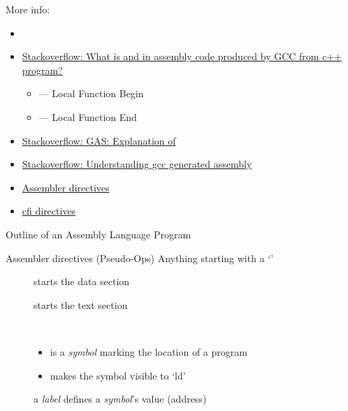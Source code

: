 More info:
\begin{itemize}
\item {}
\item
  \href{http://stackoverflow.com/questions/3564752/what-is-cfi-and-lfe-in-assembly-code-produced-by-gcc-from-c-program}{Stackoverflow:
    What is  and  in assembly code produced by GCC from c++
    program?}
  \begin{itemize}
  \item {} --- Local Function Begin
  \item {} --- Local Function End
  \end{itemize}
\item
  \href{http://stackoverflow.com/questions/7534420/gas-explanation-of-cfi-def-cfa-offset}{Stackoverflow:
    GAS: Explanation of }
\item
  \href{http://stackoverflow.com/questions/8478491/understanding-base-pointer-and-stack-pointers-in-context-with-gcc-output}{Stackoverflow:
    Understanding gcc generated assembly}
\item \href{http://sourceware.org/binutils/docs/as/Pseudo-Ops.html#Pseudo-Ops}{Assembler
    directives}
\item \href{http://blog.mozilla.com/respindola/2011/05/12/cfi-directives/}{cfi directives}
\end{itemize}

\begin{frame}{Outline of an Assembly Language Program}
  \begin{block}{Assembler directives (Pseudo-Ops)}
    Anything starting with a `'
    \begin{description}
    \item[] starts the data section
    \item[] starts the text section
    \item[] \ 
      \begin{itemize}
      \item[\code{SYMBOL}] is a \emph{symbol} marking the location of a program
      \item[\code{.globl}] makes the symbol visible to `ld'
      \end{itemize}
    \item[] a \emph{label} defines a \emph{symbol}'s value (address)
    \end{description}
  \end{block}
\end{frame}

